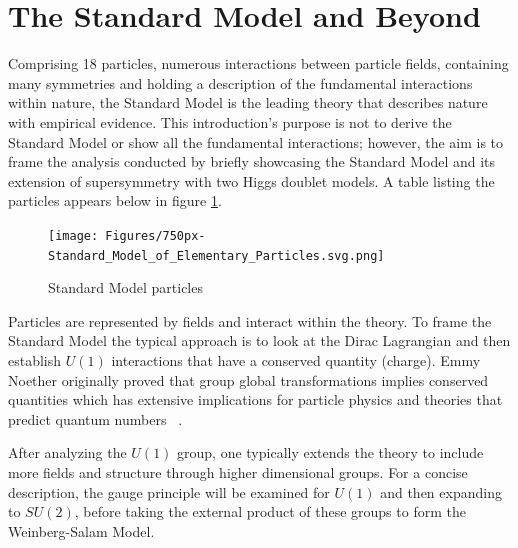\section{The Standard Model and Beyond}

Comprising 18 particles, numerous interactions between particle fields, containing many symmetries and holding a description of the fundamental interactions within nature, the Standard Model is the leading theory that describes nature with empirical evidence. This introduction's purpose is not to derive the Standard Model or show all the fundamental interactions; however, the aim is to frame the analysis conducted by briefly showcasing the Standard Model and its extension of supersymmetry with two Higgs doublet models. A table listing the particles appears below in figure \ref{fig:SM}. 
\begin{figure}[ht!b]
  \centering
  \texttt{[image: Figures/750px-Standard\_Model\_of\_Elementary\_Particles.svg.png]}
  \caption{\label{fig:SM} Standard Model particles }
\end{figure}

Particles are represented by fields and interact within the theory. To frame the Standard Model the typical approach is to look at the Dirac Lagrangian and then establish $U(1) $ interactions that have a conserved quantity (charge). 
Emmy Noether originally proved that group global transformations implies conserved quantities which has extensive implications for particle physics and theories that predict quantum numbers ~\cite{Noether_1971}. 

After analyzing the $U(1)$ group, one typically extends the theory to include more fields and structure through higher dimensional groups. For a concise description, the gauge principle will be examined for $U(1)$ and then expanding to $SU(2)$, before taking the external product of these groups to form the Weinberg-Salam Model.

